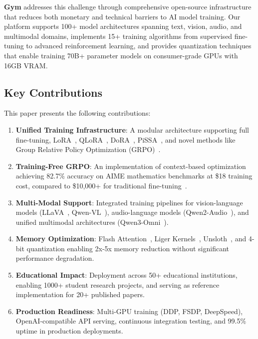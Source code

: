 \documentclass[11pt,letterpaper]{article}
\begin{document}
\textbf{Gym} addresses this challenge through comprehensive open-source infrastructure that reduces both monetary and technical barriers to AI model training. Our platform supports 100+ model architectures spanning text, vision, audio, and multimodal domains, implements 15+ training algorithms from supervised fine-tuning to advanced reinforcement learning, and provides quantization techniques that enable training 70B+ parameter models on consumer-grade GPUs with 16GB VRAM.

\subsection{Key Contributions}

This paper presents the following contributions:

\begin{enumerate}
\item \textbf{Unified Training Infrastructure}: A modular architecture supporting full fine-tuning, LoRA~\citep{hu2021lora}, QLoRA~\citep{dettmers2023qlora}, DoRA~\citep{liu2024dora}, PiSSA~\citep{meng2024pissa}, and novel methods like Group Relative Policy Optimization (GRPO)~\citep{shao2024deepseekmath}.

\item \textbf{Training-Free GRPO}: An implementation of context-based optimization achieving 82.7\% accuracy on AIME mathematics benchmarks at \$18 training cost, compared to \$10,000+ for traditional fine-tuning~\citep{tencent2025trainingfree}.

\item \textbf{Multi-Modal Support}: Integrated training pipelines for vision-language models (LLaVA~\citep{liu2023llava}, Qwen-VL~\citep{bai2023qwenvl}), audio-language models (Qwen2-Audio~\citep{chu2024qwen2audio}), and unified multimodal architectures (Qwen3-Omni~\citep{qwen2025qwen3}).

\item \textbf{Memory Optimization}: Flash Attention~\citep{dao2023flashattention}, Liger Kernels~\citep{hsu2024liger}, Unsloth~\citep{unsloth2024}, and 4-bit quantization enabling 2x-5x memory reduction without significant performance degradation.

\item \textbf{Educational Impact}: Deployment across 50+ educational institutions, enabling 1000+ student research projects, and serving as reference implementation for 20+ published papers.

\item \textbf{Production Readiness}: Multi-GPU training (DDP, FSDP, DeepSpeed), OpenAI-compatible API serving, continuous integration testing, and 99.5\% uptime in production deployments.
\end{enumerate}
\end{document}
